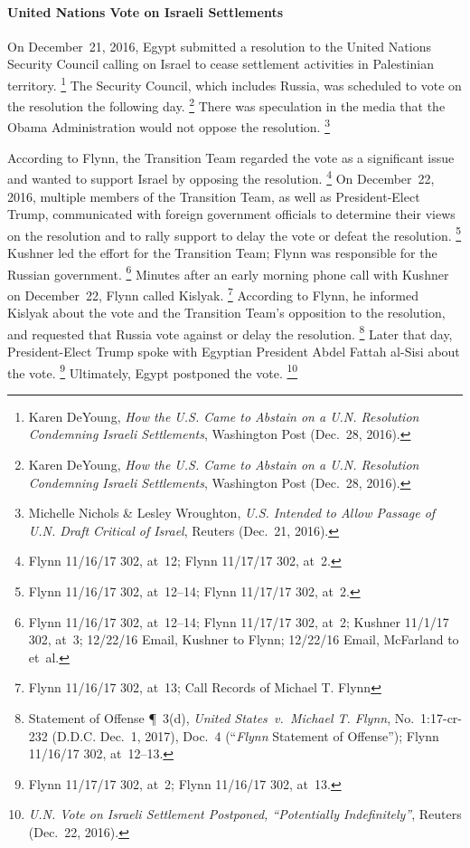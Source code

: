 \paragraph{United Nations Vote on Israeli Settlements}

On December~21, 2016, Egypt submitted a resolution to the United Nations Security Council calling on Israel to cease settlement activities in Palestinian territory.%
\footnote{Karen DeYoung, \textit{How the U.S. Came to Abstain on a U.N. Resolution Condemning Israeli Settlements}, Washington Post (Dec.~28, 2016).}
The Security Council, which includes Russia, was scheduled to vote on the resolution the following day.%
\footnote{Karen DeYoung, \textit{How the U.S. Came to Abstain on a U.N. Resolution Condemning Israeli Settlements}, Washington Post (Dec.~28, 2016).}
There was speculation in the media that the Obama Administration would not oppose the resolution.%
\footnote{Michelle Nichols \& Lesley Wroughton, \textit{U.S. Intended to Allow Passage of U.N. Draft Critical of Israel}, Reuters (Dec.~21, 2016).}

According to Flynn, the Transition Team regarded the vote as a significant issue and wanted to support Israel by opposing the resolution.%
\footnote{Flynn 11/16/17 302, at~12;
Flynn 11/17/17 302, at~2.}
On December~22, 2016, multiple members of the Transition Team, as well as President-Elect Trump, communicated with foreign government officials to determine their views on the resolution and to rally support to delay the vote or defeat the resolution.%
\footnote{Flynn 11/16/17 302, at~12--14;
Flynn 11/17/17 302, at~2.}
Kushner led the effort for the Transition Team; Flynn was responsible for the Russian government.%
\footnote{Flynn 11/16/17 302, at~12--14;
Flynn 11/17/17 302, at~2;
Kushner 11/1/17 302, at~3;
12/22/16 Email, Kushner to Flynn;
12/22/16 Email, McFarland to  et~al.}
Minutes after an early morning phone call with Kushner on December~22, Flynn called Kislyak.%
\footnote{Flynn 11/16/17 302, at~13;
Call Records of Michael T. Flynn }
According to Flynn, he informed Kislyak about the vote and the Transition Team's opposition to the resolution, and requested that Russia vote against or delay the resolution.%
\footnote{Statement of Offense \P~3(d), \textit{United States~v.\ Michael T. Flynn}, No.~1:17-cr-232 (D.D.C. Dec.~1, 2017), Doc.~4 (``\textit{Flynn} Statement of Offense'');
Flynn 11/16/17 302, at~12--13.}
Later that day, President-Elect Trump spoke with Egyptian President Abdel Fattah al-Sisi about the vote.%
\footnote{Flynn 11/17/17 302, at~2;
Flynn 11/16/17 302, at~13.}
Ultimately, Egypt postponed the vote.%
\footnote{\textit{U.N. Vote on Israeli Settlement Postponed, ``Potentially Indefinitely''}, Reuters (Dec.~22, 2016).}

